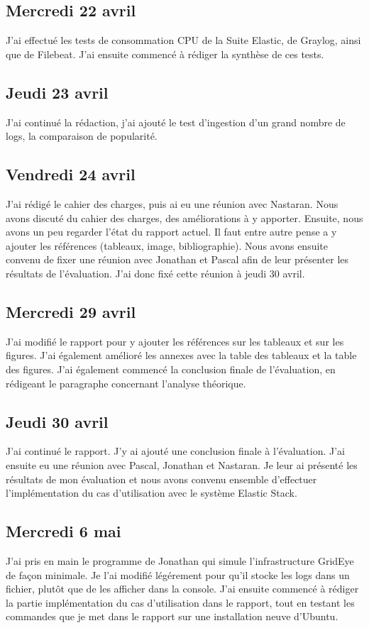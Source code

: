 \documentclass[paper=a4, fontsize=11pt]{scrartcl}
\begin{document}
\subsection{Mercredi 22 avril}
    J'ai effectué les tests de consommation CPU de la Suite Elastic, de Graylog, ainsi que de Filebeat. J'ai ensuite commencé à rédiger la synthèse de ces tests.
\subsection{Jeudi 23 avril}
    J'ai continué la rédaction, j'ai ajouté le test d'ingestion d'un grand nombre de logs, la comparaison de popularité.
\subsection{Vendredi 24 avril}
    J'ai rédigé le cahier des charges, puis ai eu une réunion avec Nastaran. Nous avons discuté du cahier des charges, des améliorations à y apporter. Ensuite, nous avons un peu regarder l'état du rapport actuel. Il faut entre autre pense a y ajouter les références (tableaux, image, bibliographie). Nous avons ensuite convenu de fixer une réunion avec Jonathan et Pascal afin de leur présenter les résultats de l'évaluation. J'ai donc fixé cette réunion à jeudi 30 avril.
\subsection{Mercredi 29 avril}
    J'ai modifié le rapport pour y ajouter les références sur les tableaux et sur les figures. J'ai également amélioré les annexes avec la table des tableaux et la table des figures. J'ai également commencé la conclusion finale de l'évaluation, en rédigeant le paragraphe concernant l'analyse théorique.
\subsection{Jeudi 30 avril}
    J'ai continué le rapport. J'y ai ajouté une conclusion finale à l'évaluation. J'ai ensuite eu une réunion avec Pascal, Jonathan et Nastaran. Je leur ai présenté les résultats de mon évaluation et nous avons convenu ensemble d'effectuer l'implémentation du cas d'utilisation avec le système Elastic Stack.
\subsection{Mercredi 6 mai}
    J'ai pris en main le programme de Jonathan qui simule l'infrastructure GridEye de façon minimale. Je l'ai modifié légérement pour qu'il stocke les logs dans un fichier, plutôt que de les afficher dans la console. J'ai ensuite commencé à rédiger la partie implémentation du cas d'utilisation dans le rapport, tout en testant les commandes que je met dans le rapport sur une installation neuve d'Ubuntu.
\end{document}
